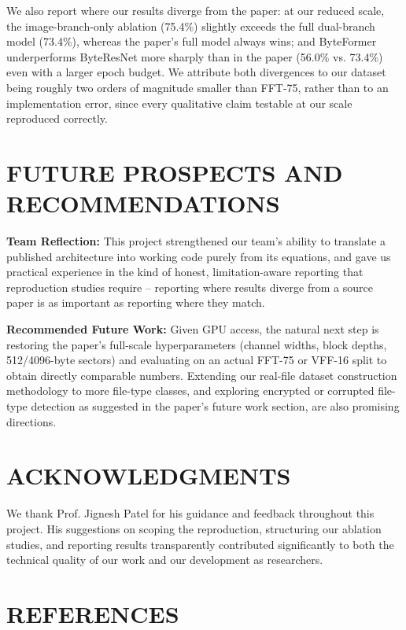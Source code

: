 \documentclass[conference]{IEEEtran}
\begin{document}
{We also report where our results diverge from the paper: at our reduced scale, the image-branch-only ablation (75.4\%) slightly exceeds the full dual-branch model (73.4\%), whereas the paper's full model always wins; and ByteFormer underperforms ByteResNet more sharply than in the paper (56.0\% vs. 73.4\%) even with a larger epoch budget. We attribute both divergences to our dataset being roughly two orders of magnitude smaller than FFT-75, rather than to an implementation error, since every qualitative claim testable at our scale reproduced correctly.

\section{FUTURE PROSPECTS AND RECOMMENDATIONS}

\textbf{Team Reflection:} This project strengthened our team's ability to translate a published architecture into working code purely from its equations, and gave us practical experience in the kind of honest, limitation-aware reporting that reproduction studies require -- reporting where results diverge from a source paper is as important as reporting where they match.

\textbf{Recommended Future Work:} Given GPU access, the natural next step is restoring the paper's full-scale hyperparameters (channel widths, block depths, 512/4096-byte sectors) and evaluating on an actual FFT-75 or VFF-16 split to obtain directly comparable numbers. Extending our real-file dataset construction methodology to more file-type classes, and exploring encrypted or corrupted file-type detection as suggested in the paper's future work section, are also promising directions.

\section{ACKNOWLEDGMENTS}

We thank Prof. Jignesh Patel for his guidance and feedback throughout this project. His suggestions on scoping the reproduction, structuring our ablation studies, and reporting results transparently contributed significantly to both the technical quality of our work and our development as researchers.

\section{REFERENCES}

}
\end{document}

